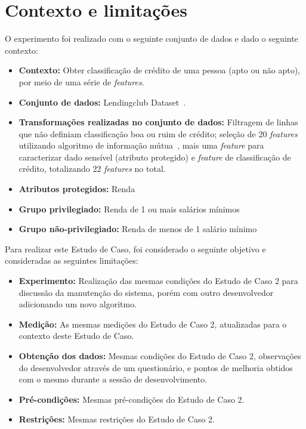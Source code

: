 \documentclass[Portugues,Final]{ic-tese-v3}
\begin{document}
\section{Contexto e limitações}

O experimento foi realizado com o seguinte conjunto de dados e dado o seguinte contexto:

\begin{itemize}
\item \textbf{Contexto:} Obter classificação de crédito de uma pessoa (apto ou não apto), por meio de uma série de \textit{features}.

\item \textbf{Conjunto de dados:} Lendingclub Dataset~\cite{lendingclub_2022}.

\item \textbf{Transformações realizadas no conjunto de dados:} Filtragem de linhas que não definiam classificação boa ou ruim de crédito; seleção de 20 \textit{features} utilizando algoritmo de informação mútua~\cite{Ross_2014}, mais uma \textit{feature} para caracterizar dado sensível (atributo protegido) e \textit{feature} de classificação de crédito, totalizando 22 \textit{features} no total.

\item \textbf{Atributos protegidos:} Renda

\item \textbf{Grupo privilegiado:} Renda de 1 ou mais salários mínimos

\item \textbf{Grupo não-privilegiado:} Renda de menos de 1 salário mínimo

\end{itemize}

Para realizar este Estudo de Caso, foi considerado o seguinte objetivo e consideradas as seguintes limitações:

\begin{itemize}
\item \textbf{Experimento:} Realização das mesmas condições do Estudo de Caso 2 para discussão da manutenção do sistema, porém com outro desenvolvedor adicionando um novo algoritmo.

\item \textbf{Medição:} As mesmas medições do Estudo de Caso 2, atualizadas para o contexto deste Estudo de Caso.

\item \textbf{Obtenção dos dados:} Mesmas condições do Estudo de Caso 2, observações do desenvolvedor através de um questionário, e pontos de melhoria obtidos com o mesmo durante a sessão de desenvolvimento.

\item \textbf{Pré-condições:} Mesmas pré-condições do Estudo de Caso 2.

\item \textbf{Restrições:} Mesmas restrições do Estudo de Caso 2.
\end{itemize}
\end{document}
